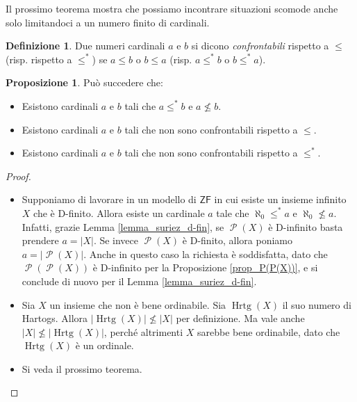 \documentclass[12pt,a4paper]{report}
\theoremstyle{definition}
\newtheorem{defn}[teo]{Definizione}  %
\newtheorem{prop}[teo]{Proposizione}  %
\theoremstyle{num.custom-title}
\DeclareMathOperator{\PP}{\mathcal{P}}
\DeclareMathOperator{\Hrtg}{\text{Hrtg}}
\newcommand{\ZF}{\ensuremath{\mathsf{ZF}}\xspace}
\begin{document}
Il prossimo teorema mostra che possiamo incontrare situazioni scomode anche solo limitandoci a un numero finito di cardinali.

\begin{defn}
Due numeri cardinali $a$ e $b$ si dicono \emph{confrontabili} rispetto a $\leq$ (risp. rispetto a $\leq^*$) se $a \leq b$ o $b \leq a$ (risp. $a \leq^* b$ o $b \leq^* a$).
\end{defn}

\begin{prop}
Può succedere che:
\begin{itemize}
\item[(1)] Esistono cardinali $a$ e $b$ tali che $a \leq^* b$ e $a \not\leq b$.
\item[(2)] Esistono cardinali $a$ e $b$ tali che non sono confrontabili rispetto a $\leq$.
\item[(3)] Esistono cardinali $a$ e $b$ tali che non sono confrontabili rispetto a $\leq^*$.
\end{itemize}
\begin{proof}\ 
\begin{itemize}
\item[(1)] Supponiamo di lavorare in un modello di \ZF in cui esiste un insieme infinito $X$ che è D-finito. Allora esiste un cardinale $a$ tale che $\aleph_0 \leq^* a$ e $\aleph_0 \not\leq a$. Infatti, grazie Lemma \ref{lemma_suriez_d-fin}, se $\PP(X)$ è D-infinito basta prendere $a=|X|$. Se invece $\PP(X)$ è D-finito, allora poniamo $a=|\PP(X)|$. Anche in questo caso la richiesta è soddisfatta, dato che $\PP(\PP(X))$ è D-infinito per la Proposizione \ref{prop_P(P(X))}, e si conclude di nuovo per il Lemma \ref{lemma_suriez_d-fin}.
\item[(2)] Sia $X$ un insieme che non è bene ordinabile. Sia $\Hrtg(X)$ il suo numero di Hartogs. Allora $|\Hrtg(X)| \not\leq |X|$ per definizione. Ma vale anche $|X| \not\leq |\Hrtg(X)|$, perché altrimenti $X$ sarebbe bene ordinabile, dato che $\Hrtg(X)$ è un ordinale.
\item[(3)] Si veda il prossimo teorema.
\end{itemize}
\end{proof}
\end{prop}
\end{document}
